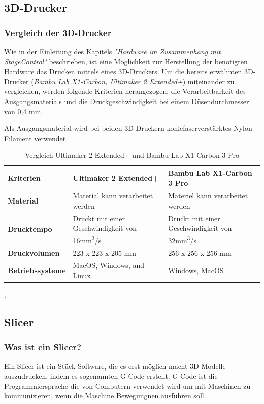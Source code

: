 \subsection{3D-Drucker}

\subsubsection{Vergleich der 3D-Drucker}
Wie in der Einleitung des Kapitels \emph{"Hardware im Zusammenhang mit StageControl"} beschrieben, ist eine Möglichkeit zur Herstellung der benötigten Hardware das Drucken mittels eines 3D-Druckers. Um die bereits erwähnten 3D-Drucker (\emph{Bambu Lab X1-Carbon, Ultimaker 2 Extended+}) miteinander zu vergleichen, werden folgende Kriterien herangezogen: die Verarbeitbarkeit des Ausgangsmaterials und die Druckgeschwindigkeit bei einem Düsendurchmesser von 0,4 mm. 

Als Ausgangsmaterial wird bei beiden 3D-Druckern kohlefaserverstärktes Nylon-Filament verwendet.

\begin{table} [H]
	\begin{tabular}{ |p{2.7cm} |p{4.8cm}|p{4.8cm}| }
		\hline
		 \textbf{Kriterien} & \textbf{Ultimaker 2 Extended+}& \textbf{Bambu Lab X1-Carbon 3 Pro}\\
		\hline
		\textbf{Material} & Material kann verarbeitet werden & Materiel kann verarbeitet werden   \\ 
		\hline
		\textbf{Drucktempo} & Druckt mit einer Geschwindigkeit von 16mm\textsuperscript{3}/s & Druckt mit einer Geschwindigkeit von 32mm\textsuperscript{3}/s   \\  
		\hline
		\textbf{Druckvolumen} & 223 x 223 x 205 mm & 256 x 256 x 256 mm \\
		\hline
		\textbf{Betriebssysteme} & MacOS, Windows, and Linux & Windows, MacOS \\
		\hline
	\end{tabular}
	\caption{Vergleich  Ultimaker 2 Extended+ und Bambu Lab X1-Carbon 3 Pro}
\end{table}
\cite{BambuLabX1-Carbon3DPrinter-Specifications}, \cite{Ultimaker2Extended+-Specification}

\subsection{Slicer}
\subsubsection{Was ist ein Slicer?}
Ein Slicer ist ein Stück Software, die es erst möglich macht 3D-Modelle auszudrucken, indem es sogenannten G-Code erstellt. G-Code ist die Programmiersprache die von Computern verwendet wird um mit Maschinen zu kommunizieren, wenn die Maschine Bewegungnen ausführen soll. \\
\cite{Slicer_G-Code}


